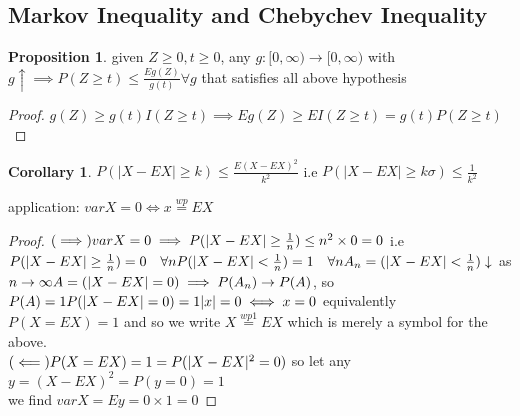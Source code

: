 \documentclass{article}
\theoremstyle{definition}
\theoremstyle{thrm}
\theoremstyle{lma}
\theoremstyle{ppst}
\newtheorem{ppst}{Proposition}[section]
\theoremstyle{crlr}
\newtheorem{crlr}{Corollary}[section]
\begin{document}
\subsection{Markov Inequality and Chebychev Inequality}
\begin{ppst}
	given $Z\geq 0,t\geq 0$, any $g:[0,\infty) \to [0,\infty)$ with $g \uparrow \implies P(Z\geq t)\leq \frac{Eg(Z)}{g(t)} \forall g$ that satisfies all above hypothesis
\end{ppst}
\begin{proof}
	$g(Z)\geq g(t)I(Z\geq t) \implies Eg(Z)\geq EI(Z\geq t) = g(t)P(Z\geq t)$
\end{proof}
\begin{crlr}
	$P(|X-EX|\geq k)\leq \frac{E(X-EX)^2}{k^2}$ i.e $P(|X-EX|\geq k\sigma) \leq \frac{1}{k^2}$
\end{crlr}
application: $varX=0 \iff x \stackrel{wp}{=} EX$
\begin{proof}
	$\\(\implies) \\varX = 0 \implies P(|X-EX|\geq \frac{1}{n})\leq n^2 \times 0=0\\$
	i.e $P(|X-EX|\geq \frac{1}{n})=0 \quad \forall n\\
	P(|X-EX|< \frac{1}{n}) = 1 \quad \forall n\\
	A_n = (|X-EX| < \frac{1}{n})\downarrow$ as $n\to \infty\\
	A = (|X-EX| = 0)\implies P(A_n)\to P(A)$, so $P(A) = 1\\
	P(|X-EX| = 0)=1\\
	|x| = 0 \iff x=0\\$
	equivalently $P(X=EX) = 1$ and so we write $X \stackrel{wp1}{=}EX$ which is merely a symbol for the above.\\
	$(\impliedby)\\P(X=EX) = 1 = P(|X-EX|^2=0)$ so let any $y=(X-EX)^2 = P(y=0)=1$\\
	we find $varX = Ey = 0 \times 1=0$
\end{proof}
\end{document}
